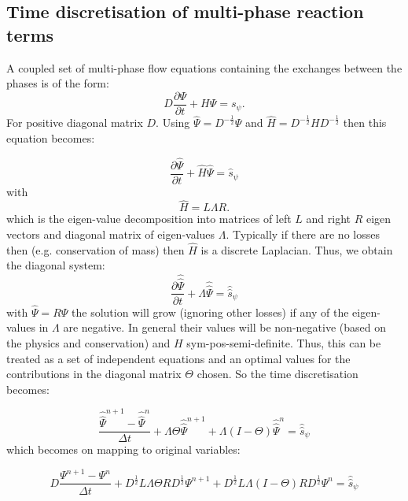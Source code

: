 \subsection{Time discretisation of multi-phase reaction terms}
A coupled set of multi-phase flow equations containing the exchanges between the phases is of the form:
\begin{equation}
D \frac{\partial \Psi}{\partial t} + H \Psi = s_\psi.
\label{w-rho-e-prob}
\end{equation}
For positive diagonal matrix $D$. Using $\hat \Psi = D^{-\frac{1}{2}} \Psi$ and $\hat H=D^{-\frac{1}{2}} H D^{-\frac{1}{2}}$ then this equation becomes:

\begin{equation}
\frac{\partial \hat \Psi}{\partial t} + \hat H \hat \Psi = \hat s_\psi
\label{w-rho-e-prob}
\end{equation}
with
\begin{equation}
\hat H
= L \Lambda R.
\label{stab_matrix}
\end{equation}
which is the eigen-value decomposition into matrices of left $L$ and right $R$ eigen vectors and diagonal matrix of eigen-values $\Lambda$. Typically if there are no losses then (e.g. conservation of mass) then $\hat H$ is a discrete Laplacian. Thus, we obtain the diagonal system:
\begin{equation}
\frac{\partial \hat {\hat \Psi}}{\partial t} + \Lambda \hat{\hat\Psi} = \hat{\hat s}_\psi
\label{e-prob}
\end{equation}
with $\hat\Psi=R\Psi$ the solution will grow (ignoring other losses) if any of the eigen-values in $\Lambda$ are negative. In general their values will be non-negative (based on the physics and conservation) and $H$ sym-pos-semi-definite.  Thus, this can be treated as a set of independent equations and an optimal values for the contributions in the diagonal matrix $\Theta$ chosen. So the time discretisation becomes:


\begin{equation}
\frac{\hat {\hat \Psi}^{n+1}-\hat {\hat \Psi}^{n}}{\Delta t} + \Lambda \Theta\hat{\hat\Psi}^{n+1} +\Lambda(I-\Theta) \hat{\hat\Psi}^n= \hat{\hat s}_\psi
\label{e-prob-time-term-opt-theta}
\end{equation}
which becomes on mapping to original variables:

\begin{equation}
D\frac{ { \Psi^{n+1}}- {\Psi^{n}}}{\Delta t}
+ D^{\frac{1}{2}} L\Lambda \Theta R D^{\frac{1}{2}} {\Psi^{n+1}}
+ D^{\frac{1}{2}} L\Lambda (I-\Theta) R D^{\frac{1}{2}} {\Psi^{n}}
= \hat{\hat s}_\psi
\label{e-prob-time-term-opt-theta-orig-var}
\end{equation}

